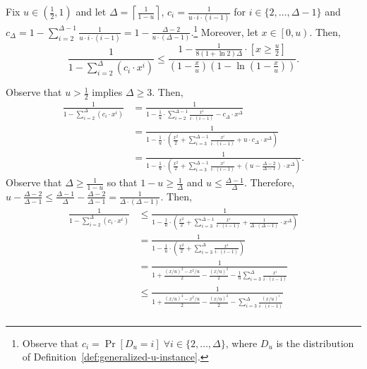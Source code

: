 \documentclass[11pt]{article}
\begin{document}
\begin{lemmarep}\label{lem:partial_ub}
Fix $u \in \left(\frac12,1\right)$ and let $\Delta = \left\lceil\frac1{1-u}\right\rceil$, $c_i = \frac1{u \cdot i\cdot(i-1)}$ for $i \in \{2,\ldots,\Delta-1\}$ and $c_\Delta = 1-\sum_{i=2}^{\Delta-1} \frac1{u \cdot i \cdot (i-1)} = 1 - \frac{\Delta-2}{u \cdot(\Delta-1)}$.\footnote{Observe that $c_i = \Pr[D_u = i] \; \forall i \in \{2,\ldots,\Delta\}$, where $D_u$ is the distribution of Definition~\ref{def:generalized-u-instance}.}
    Moreover, let $x \in \left[0,u\right)$. Then, 
    \[
    \frac1{1- \sum_{i=2}^\Delta \left(c_i \cdot x^i\right)} \le  \frac{1-\frac{1}{8(1+\ln 2)\Delta} \cdot \left[ x \ge \frac{u}{2}\right]}{\left(1-\frac xu\right)\left(1-\ln\left(1-\frac xu\right)\right)}.
    \]
\end{lemmarep}
\begin{appendixproof}
Observe that $u > \frac12$ implies $\Delta \ge 3$. Then,
\begin{align*}
    \frac1{1- \sum_{i=2}^\Delta \left(c_i \cdot x^i\right)} &=
     \frac1{1- \frac1u \cdot \sum_{i=2}^{\Delta-1} \frac{x^i}{i\cdot(i-1)} -  c_\Delta \cdot x^{\Delta} } \\
    &=\frac1{1-\frac 1u\cdot\left(\frac{x^2}2+\sum_{i=3}^{\Delta-1} \frac{x^i}{i \cdot (i-1)}+u \cdot c_\Delta \cdot x^{\Delta}\right)}\\
    &=\frac1{1-\frac 1u\cdot\left(\frac{x^2}2+\sum_{i=3}^{\Delta-1} \frac{x^i}{i \cdot (i-1)}+\left(u - \frac{\Delta-2}{\Delta-1}\right) \cdot x^{\Delta}\right)}.
\end{align*}
Observe that $\Delta \ge \frac1{1-u}$ so that $1-u \ge \frac1{\Delta}$ and $u \le  \frac{\Delta-1}{\Delta}$. Therefore, $u - \frac{\Delta-2}{\Delta-1} \le \frac{\Delta-1}{\Delta} - \frac{\Delta-2}{\Delta-1} =\frac1{\Delta\cdot(\Delta-1)}$. Then,
\begin{align*}
    \frac1{1- \sum_{i=2}^\Delta \left(c_i \cdot x^i\right)} &\le \frac1{1-\frac 1u\cdot\left(\frac{x^2}2+\sum_{i=3}^{\Delta-1} \frac{x^i}{i \cdot (i-1)}+\frac1{\Delta\cdot(\Delta -1)}\cdot x^{\Delta}\right)}\\
    &=\frac1{1-\frac 1u\cdot\left(\frac{x^2}2+\sum_{i=3}^{\Delta} \frac{x^i}{i \cdot (i-1)}\right)}\\
    &=\frac1{1+\frac{(x/u)^2 -x^2/u}2-\frac{(x/u)^2}2-\frac1u\sum_{i=3}^{\Delta} \frac{x^i}{i \cdot (i-1)}}\\
    &\le\frac1{1+\frac{(x/u)^2 -x^2/u}2-\frac{(x/u)^2}2-\sum_{i=3}^{\Delta} \frac{(x/u)^i}{i \cdot (i-1)}}\\

\end{align*}
\end{appendixproof}
\end{document}
